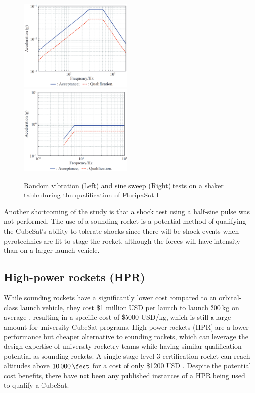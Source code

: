 \documentclass[draft]{report}
\begin{document}
\begin{figure}[H]
  \includegraphics[width=0.495\textwidth]{images/floripa-random-spectrum.png}
  \includegraphics[width=0.495\textwidth]{images/floripa-sinusoid.png}
  \caption{Random vibration (Left) and sine sweep (Right) tests on a shaker table during the qualification of FloripaSat-I \cite{9316404}}
  \label{fig:shaker}
\end{figure}

Another shortcoming of the study is that a shock test using a half-sine pulse was not performed. The use of a sounding rocket is a potential method of qualifying the CubeSat's ability to tolerate shocks since there will be shock events when pyrotechnics are lit to stage the rocket, although the forces will have intensity than on a larger launch vehicle.

\subsection{High-power rockets (HPR)}
While sounding rockets have a significantly lower cost compared to an orbital-class launch vehicle, they cost \$1 million USD per launch to launch $\SI{200}{\kilo\gram}$ on average \cite{jurist2009commercial}, resulting in a specific cost of \$5000 USD/kg, which is still a large amount for university CubeSat programs. High-power rockets (HPR) are a lower-performance but cheaper alternative to sounding rockets, which can leverage the design expertise of university rocketry teams while having similar qualification potential as sounding rockets. A single stage level 3 certification rocket can reach altitudes above $\SI{10000}{\feet}$ \cite{canepa2005modern} for a cost of only \$1200 USD \cite{canepa2005modern}. Despite the potential cost benefits, there have not been any published instances of a HPR being used to qualify a CubeSat.
\end{document}
